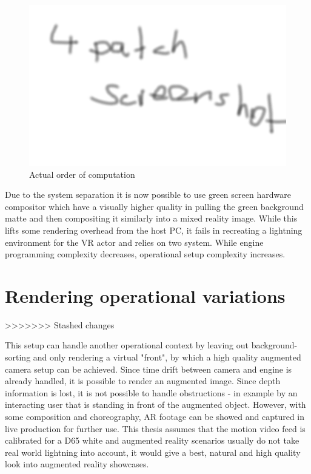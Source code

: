 \begin{figure}[htb]
	\includegraphics[width=\textwidth]{_raw_resources/4patch_composite.png}
	\caption{Actual order of computation}
	\label{fig:alt-render:4patch}
\end{figure}

Due to the system separation it is now possible to use green screen hardware 
compositor which have a visually higher quality in pulling the green background 
matte and then compositing it similarly into a mixed reality image. While this 
lifts some rendering overhead from the host PC, it fails in recreating a 
lightning environment for the VR actor and relies on two system. While engine 
programming complexity decreases, operational setup complexity increases.

\section{Rendering operational variations}
>>>>>>> Stashed changes

This setup can handle another operational context by leaving out 
background-sorting and only rendering a virtual "front", by which a high 
quality augmented camera setup can be achieved. Since time drift between camera 
and engine is already handled, it is possible to render an augmented image. 
Since depth information is lost, it is not possible to handle obstructions - in 
example by an interacting user that is standing in front of the augmented 
object. However, with some composition and choreography, AR footage can be 
showed and captured in live production for further use.
\newline
This thesis assumes that the motion video feed is calibrated for a D65 white 
and augmented reality scenarios usually do not take real world lightning into 
account, it would give a best, natural and high quality look into augmented 
reality showcases.

